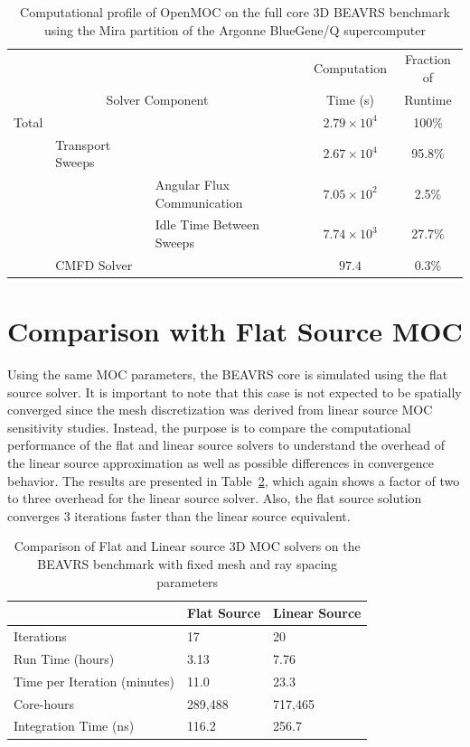 \begin{table}[ht]
	\centering
	\caption{Computational profile of OpenMOC on the full core 3D BEAVRS benchmark using the Mira partition of the Argonne BlueGene/Q supercomputer}
	\medskip
	\begin{tabular}{lll|c|c}
		\hline
		& & & Computation & Fraction of \\
		\multicolumn{3}{c|}{Solver Component} & Time (s) & Runtime\\
		\hline
		Total & & & $2.79 \times 10^4$ & 100\% \\
		& Transport Sweeps & & $2.67 \times 10^4$ & 95.8\% \\
		& & Angular Flux Communication & $7.05 \times 10^2$ & 2.5\% \\
		& & Idle Time Between Sweeps & $7.74 \times 10^3$ & 27.7\% \\
		& CMFD Solver & & $97.4$ & 0.3\% \\		
		\hline
	\end{tabular}
	\label{tab:full-core-comp-prof}
\end{table}

\newpage

\section{Comparison with Flat Source MOC}
\label{sec:fc-flat-source}

Using the same \ac{MOC} parameters, the BEAVRS core is simulated using the flat source solver. It is important to note that this case is not expected to be spatially converged since the mesh discretization was derived from linear source \ac{MOC} sensitivity studies. Instead, the purpose is to compare the computational performance of the flat and linear source solvers to understand the overhead of the linear source approximation as well as possible differences in convergence behavior. The results are presented in Table~\ref{tab:fc-comp-flat-linear}, which again shows a factor of two to three overhead for the linear source solver. Also, the flat source solution converges 3 iterations faster than the linear source equivalent. 

\begin{table}[ht]
	\centering
	\caption{Comparison of Flat and Linear source 3D \ac{MOC} solvers on the BEAVRS benchmark with fixed mesh and ray spacing parameters}
	\medskip
	\begin{tabular}{l|l|l}
		\hline
		 & Flat Source & Linear Source \\
		\hline
		Iterations & 17 & 20 \\
		Run Time (hours) & 3.13 & 7.76 \\
		Time per Iteration (minutes) & 11.0 & 23.3 \\
		Core-hours & 289,488 & 717,465 \\
		Integration Time (ns) & 116.2 & 256.7 \\
		\hline
	\end{tabular}
	\label{tab:fc-comp-flat-linear}
\end{table}

